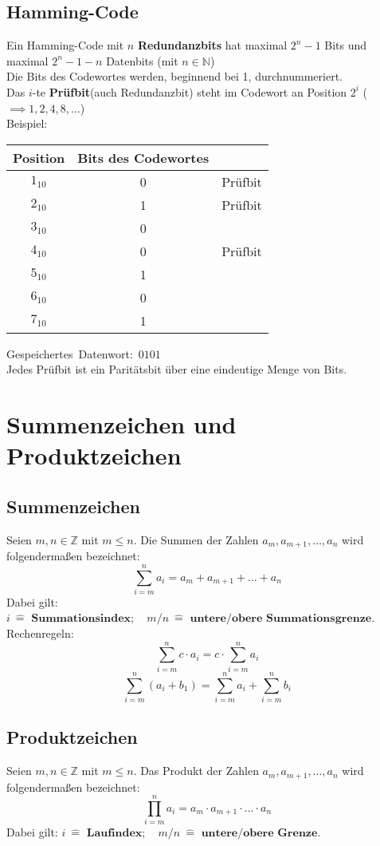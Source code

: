 \documentclass[12pt]{article}
\begin{document}
\subsection{Hamming-Code}
Ein Hamming-Code mit $n$ \textbf{Redundanzbits} hat maximal $2^n - 1$ Bits und maximal $2^n -1 - n$ Datenbits (mit $n \in \mathbb{N}$)\\
Die Bits des Codewortes werden, beginnend bei 1, durchnummeriert. \\
Das $i$-te \textbf{Prüfbit}(auch Redundanzbit) steht im Codewort an Position $2^i$ ($\implies 1,2,4,8,\dots$) \\
Beispiel: \begin{tabular}{c|c c}
    Position & Bits des Codewortes & \\ \hline
    \cellcolor{lightgray}$1_{10}$ & \cellcolor{lightgray}0 & Prüfbit \\
    \cellcolor{lightgray}$2_{10}$ & \cellcolor{lightgray}1 & Prüfbit \\
    $3_{10}$ & 0 & \\
    \cellcolor{lightgray}$4_{10}$ & \cellcolor{lightgray}0 & Prüfbit \\
    $5_{10}$ & 1 & \\
    $6_{10}$ & 0 & \\
    $7_{10}$ & 1 & \\
\end{tabular} \hbox{Gespeichertes Datenwort: $0101$} \\
Jedes Prüfbit ist ein Paritätsbit über eine eindeutige Menge von Bits.

\newpage
\section{Summenzeichen und Produktzeichen}
\subsection{Summenzeichen}
Seien $m, n \in \mathbb{Z}$ mit $m \leq n$. Die Summen der Zahlen $a_m, a_{m+1}, \dots, a_n$ wird folgendermaßen bezeichnet:
\[\sum_{i=m}^{n}a_i = a_m + a_{m+1} + \ldots + a_n\]
Dabei gilt: $i \: \widehat{=} \textbf{ Summationsindex}; \quad m/n \: \widehat{=} \textbf{ untere/obere Summationsgrenze}$.
Rechenregeln:
\[\sum_{i=m}^{n}c \cdot a_i = c \cdot \sum_{i=m}^{n}a_i\]
\[\sum_{i=m}^{n}(a_i + b_1) = \sum_{i=m}^{n}a_i + \sum_{i=m}^{n}b_i\]
\subsection{Produktzeichen}
Seien $m, n \in \mathbb{Z}$ mit $m \leq n$. Das Produkt der Zahlen $a_m, a_{m+1},\ldots, a_n$ wird folgendermaßen bezeichnet:
\[\prod_{i=m}^{n}a_i = a_m \cdot a_{m+1} \cdot \ldots \cdot a_n\]
Dabei gilt: $i \: \widehat{=} \textbf{ Laufindex}; \quad m/n \: \widehat{=} \textbf{ untere/obere Grenze}$.
\end{document}
